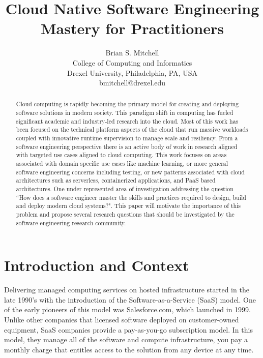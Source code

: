 \documentclass[conference]{IEEEtran}
\title{ 
        	Cloud Native Software Engineering Mastery for Practitioners 
      }
\author{
			Brian S. Mitchell\\
			College of Computing and Informatics\\
			Drexel University, Philadelphia, PA, USA\\
			bmitchell@drexel.edu
}
\date{}
\begin{document}
%

\maketitle



\begin{abstract}

Cloud computing is rapidly becoming the primary model for creating and deploying software solutions in modern society.  This paradigm shift in computing has fueled significant academic and industry-led research into the cloud.  Most of this work has been focused on the technical platform aspects of the cloud that run massive workloads coupled with innovative runtime supervision to manage scale and resiliency.  From a software engineering perspective there is an active body of work in research aligned with targeted use cases aligned to cloud computing.  This work focuses on areas associated with domain specific use cases like machine learning, or more general software engineering concerns including testing, or new patterns associated with cloud architectures such as serverless, containerized applications, and PaaS based architectures. One under represented area of investigation addressing the question ``How does a software engineer master the skills and practices required to design, build and deploy modern cloud systems?".  This paper will motivate the importance of this problem and propose several research questions that should be investigated by the software engineering research community. 


\end{abstract}  



\section{Introduction and Context}
\label{Intro}
Delivering managed computing services on hosted infrastructure started in the late 1990's with the introduction of the Software-as-a-Service (SaaS) model. One of the early pioneers of this model was Salesforce.com\cite{SalesforceHistory}, which launched in 1999.  Unlike other companies that licensed software  deployed on customer-owned equipment, SaaS companies provide a pay-as-you-go  subscription model. In this model, they manage all of the software and compute infrastructure, you pay a monthly charge that entitles access to the solution from any device at any time.     
\end{document}
